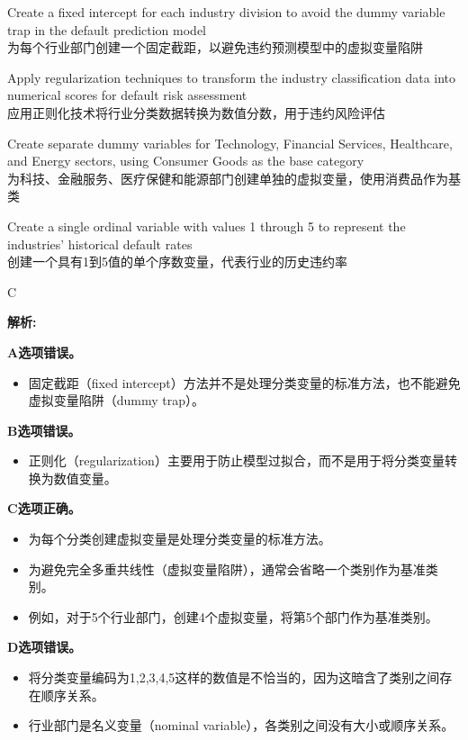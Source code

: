 \documentclass{article}
\newenvironment{explanation}
{\textbf{解析:}\par}
{\par}
\begin{document}
\begin{choices}
    \item Create a fixed intercept for each industry division to avoid the dummy variable trap in the default prediction model\\
    为每个行业部门创建一个固定截距，以避免违约预测模型中的虚拟变量陷阱
    \item Apply regularization techniques to transform the industry classification data into numerical scores for default risk assessment\\
    应用正则化技术将行业分类数据转换为数值分数，用于违约风险评估
    \item Create separate dummy variables for Technology, Financial Services, Healthcare, and Energy sectors, using Consumer Goods as the base category\\
    为科技、金融服务、医疗保健和能源部门创建单独的虚拟变量，使用消费品作为基类
    \item Create a single ordinal variable with values 1 through 5 to represent the industries' historical default rates\\
    创建一个具有1到5值的单个序数变量，代表行业的历史违约率
\end{choices}

\begin{correctanswer}
C
\end{correctanswer}

\begin{explanation}
\textbf{A选项错误。}
\begin{itemize}
    \item 固定截距（fixed intercept）方法并不是处理分类变量的标准方法，也不能避免虚拟变量陷阱（dummy trap）。
\end{itemize}

\textbf{B选项错误。}
\begin{itemize}
    \item 正则化（regularization）主要用于防止模型过拟合，而不是用于将分类变量转换为数值变量。
\end{itemize}

\textbf{C选项正确。}
\begin{itemize}
    \item 为每个分类创建虚拟变量是处理分类变量的标准方法。
    \item 为避免完全多重共线性（虚拟变量陷阱），通常会省略一个类别作为基准类别。
    \item 例如，对于5个行业部门，创建4个虚拟变量，将第5个部门作为基准类别。
\end{itemize}

\textbf{D选项错误。}
\begin{itemize}
    \item 将分类变量编码为1,2,3,4,5这样的数值是不恰当的，因为这暗含了类别之间存在顺序关系。
    \item 行业部门是名义变量（nominal variable），各类别之间没有大小或顺序关系。
\end{itemize}
\end{explanation}
\end{document}

